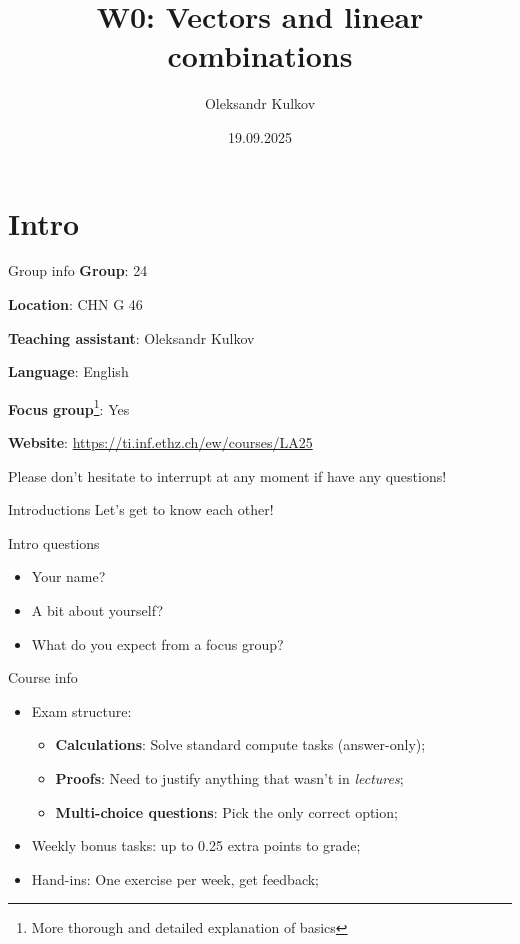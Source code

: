 \documentclass[10pt]{beamer}
\title{W0: Vectors and linear combinations}
\date{19.09.2025}
\author{Oleksandr Kulkov}
\institute{ETH Zürich}
\begin{document}
\maketitle

\section{Intro}
\begin{frame}{Group info}
    \textbf{Group}: 24

    \textbf{Location}: CHN G 46
    
    \textbf{Teaching assistant}: Oleksandr Kulkov

    \textbf{Language}: English

    \textbf{Focus group}\footnote{More thorough and detailed explanation of basics}: Yes

    \textbf{Website}: \small\url{https://ti.inf.ethz.ch/ew/courses/LA25}

    Please don't hesitate to interrupt at any moment if have any questions!
\end{frame}

\begin{frame}{Introductions}
    Let's get to know each other!

\begin{block}{Intro questions}
    \begin{itemize}
        \item Your name?
        \item A bit about yourself?
        \item What do you expect from a focus group?
    \end{itemize}
\end{block}
\end{frame}

\begin{frame}{Course info}
\begin{itemize}
    \item Exam structure:
    \begin{itemize}
        \item \textbf{Calculations}: Solve standard compute tasks (answer-only);
        \item \textbf{Proofs}: Need to justify anything that wasn't in \textit{lectures};
        \item \textbf{Multi-choice questions}: Pick the only correct option;
    \end{itemize}
    \item Weekly bonus tasks: up to 0.25 extra points to grade;
    \item Hand-ins: One exercise per week, get feedback;
\end{itemize}
\end{frame}
\end{document}
